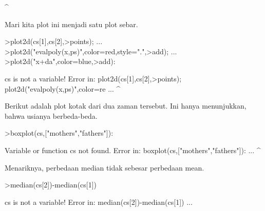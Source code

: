 \documentclass[a4paper,10pt]{article}
\begin{document}
\begin{eulernotebook}
\begin{eulercomment}
\begin{eulercomment}
\begin{eulercomment}
\begin{eulercomment}
\begin{eulercomment}
\begin{eulercomment}
\begin{eulercomment}
\begin{eulercomment}
\begin{eulercomment}
\begin{eulercomment}
\begin{eulercomment}
\begin{eulercomment}
\begin{eulercomment}
\begin{eulercomment}
\begin{eulercomment}
\begin{eulercomment}
\begin{eulercomment}
\begin{eulercomment}
\begin{eulercomment}
\begin{eulercomment}
\begin{eulercomment}
\begin{eulercomment}
\begin{eulercomment}
\begin{eulercomment}
\begin{eulercomment}
\begin{eulercomment}
\begin{eulercomment}
\begin{eulercomment}
\begin{eulercomment}
\begin{eulercomment}
\begin{eulercomment}
\begin{eulercomment}
\begin{eulercomment}
\begin{eulercomment}
\begin{eulercomment}
\begin{eulercomment}
\begin{eulercomment}
\begin{eulercomment}
\begin{eulercomment}
\begin{eulercomment}
\begin{eulercomment}
\begin{eulercomment}
\begin{eulercomment}
\begin{eulercomment}
\begin{eulercomment}
\begin{eulercomment}
\begin{eulercomment}
\begin{eulercomment}
\begin{eulercomment}
\begin{eulercomment}
\begin{eulercomment}
\begin{eulercomment}
\begin{eulercomment}
\begin{eulercomment}
\begin{eulercomment}
\begin{eulercomment}
\begin{eulercomment}
\begin{eulercomment}
\begin{eulercomment}
\begin{eulercomment}
\begin{eulercomment}
\begin{eulercomment}
\begin{eulercomment}
\begin{eulercomment}
\begin{eulercomment}
\begin{eulercomment}
\begin{euleroutput}
^
\end{euleroutput}
\begin{eulercomment}
Mari kita plot ini menjadi satu plot sebar.
\end{eulercomment}
\begin{eulerprompt}
>plot2d(cs[1],cs[2],>points);  ...
>plot2d("evalpoly(x,ps)",color=red,style=".",>add);  ...
>plot2d("x+da",color=blue,>add):
\end{eulerprompt}
\begin{euleroutput}
  cs is not a variable!
  Error in:
  plot2d(cs[1],cs[2],>points);  plot2d("evalpoly(x,ps)",color=re ...
              ^
\end{euleroutput}
\begin{eulercomment}
Berikut adalah plot kotak dari dua zaman tersebut. Ini hanya
menunjukkan, bahwa usianya berbeda-beda.
\end{eulercomment}
\begin{eulerprompt}
>boxplot(cs,["mothers","fathers"]):
\end{eulerprompt}
\begin{euleroutput}
  Variable or function cs not found.
  Error in:
  boxplot(cs,["mothers","fathers"]): ...
            ^
\end{euleroutput}
\begin{eulercomment}
Menariknya, perbedaan median tidak sebesar perbedaan mean.
\end{eulercomment}
\begin{eulerprompt}
>median(cs[2])-median(cs[1])
\end{eulerprompt}
\begin{euleroutput}
  cs is not a variable!
  Error in:
  median(cs[2])-median(cs[1]) ...
              
\end{euleroutput}
\end{eulercomment}
\end{eulercomment}
\end{eulercomment}
\end{eulercomment}
\end{eulercomment}
\end{eulercomment}
\end{eulercomment}
\end{eulercomment}
\end{eulercomment}
\end{eulercomment}
\end{eulercomment}
\end{eulercomment}
\end{eulercomment}
\end{eulercomment}
\end{eulercomment}
\end{eulercomment}
\end{eulercomment}
\end{eulercomment}
\end{eulercomment}
\end{eulercomment}
\end{eulercomment}
\end{eulercomment}
\end{eulercomment}
\end{eulercomment}
\end{eulercomment}
\end{eulercomment}
\end{eulercomment}
\end{eulercomment}
\end{eulercomment}
\end{eulercomment}
\end{eulercomment}
\end{eulercomment}
\end{eulercomment}
\end{eulercomment}
\end{eulercomment}
\end{eulercomment}
\end{eulercomment}
\end{eulercomment}
\end{eulercomment}
\end{eulercomment}
\end{eulercomment}
\end{eulercomment}
\end{eulercomment}
\end{eulercomment}
\end{eulercomment}
\end{eulercomment}
\end{eulercomment}
\end{eulercomment}
\end{eulercomment}
\end{eulercomment}
\end{eulercomment}
\end{eulercomment}
\end{eulercomment}
\end{eulercomment}
\end{eulercomment}
\end{eulercomment}
\end{eulercomment}
\end{eulercomment}
\end{eulercomment}
\end{eulercomment}
\end{eulercomment}
\end{eulercomment}
\end{eulercomment}
\end{eulercomment}
\end{eulercomment}
\end{eulercomment}
\end{eulernotebook}
\end{document}
